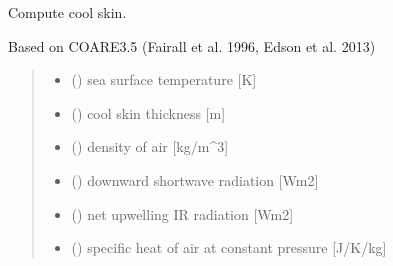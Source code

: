 \documentclass[letterpaper,10pt,english]{sphinxmanual}
\begin{document}
\begin{fulllineitems}
\label{\detokenize{users_guide:AirSeaFluxCode.cs_wl_subs.cs}}
\pysigstartsignatures
{}
\pysigstopsignatures
\sphinxAtStartPar
Compute cool skin.

\sphinxAtStartPar
Based on COARE3.5 (Fairall et al. 1996, Edson et al. 2013)
\begin{quote}\begin{description}
\begin{itemize}
\item {} 
\sphinxAtStartPar
{} () \textendash{} sea surface temperature      {[}K{]}

\item {} 
\sphinxAtStartPar
{} () \textendash{} cool skin thickness           {[}m{]}

\item {} 
\sphinxAtStartPar
{} () \textendash{} density of air               {[}kg/m\textasciicircum{}3{]}

\item {} 
\sphinxAtStartPar
{} () \textendash{} downward shortwave radiation {[}Wm\sphinxhyphen{}2{]}

\item {} 
\sphinxAtStartPar
{} () \textendash{} net upwelling IR radiation       {[}Wm\sphinxhyphen{}2{]}

\item {} 
\sphinxAtStartPar
{} () \textendash{} specific heat of air at constant pressure {[}J/K/kg{]}


\end{itemize}
\end{description}
\end{quote}
\end{fulllineitems}
\end{document}
